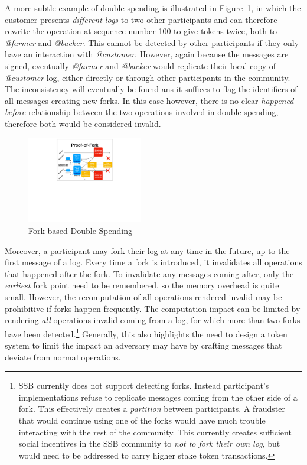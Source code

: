\documentclass[sigplan,screen,10pt]{acmart}
\begin{document}
A more subtle example of double-spending is illustrated in Figure~\ref{figure:fork-double-spend}, in which the customer presents \textit{different logs} to two other participants and can therefore rewrite the operation at sequence number 100 to give tokens twice, both to \textit{@farmer} and \textit{@backer}. This cannot be detected by other participants if they only have an interaction with \textit{@customer}. However, again because the messages are signed, eventually \textit{@farmer} and \textit{@backer} would replicate their local copy of \textit{@customer} log, either directly or through other participants in the community. The inconsistency will eventually be found ans it suffices to flag the identifiers of all messages creating new forks. In this case however, there is no clear \textit{happened-before} relationship between the two operations involved in double-spending, therefore both would be considered invalid.

\begin{figure}[htbp]
\centering
\includegraphics[width=0.45\textwidth]{figures/fork-double-spend}
\caption{Fork-based Double-Spending}
\label{figure:fork-double-spend}
\end{figure}

Moreover, a participant may fork their log at any time in the future, up to the first message of a log. Every time a fork is introduced, it invalidates all operations that happened after the fork. To invalidate any messages coming after, only the \textit{earliest} fork point need to be remembered, so the memory overhead is quite small. However, the recomputation of all operations rendered invalid may be prohibitive if forks happen frequently. The computation impact can be limited by rendering \textit{all} operations invalid coming from a log, for which more than two forks have been detected.\footnote{SSB currently does not support detecting forks. Instead participant's implementations refuse to replicate messages coming from the other side of a fork. This effectively creates a \textit{partition} between participants. A fraudster that would continue using one of the forks would have much trouble interacting with the rest of the community. This currently creates sufficient social incentives in the SSB community to \textit{not to fork their own log}, but would need to be addressed to carry higher stake token transactions.}  Generally, this also highlights the need to design a token system to limit the impact an adversary may have by crafting messages that deviate from normal operations.
\end{document}

